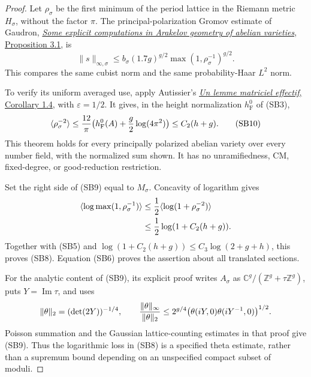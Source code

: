\begin{proof}
Let \(\rho_\sigma\) be the first minimum
of the period lattice in the Riemann metric
\(H_\sigma\), without the factor \(\pi\).
The principal-polarization Gromov estimate
of Gaudron,
\href{https://lmbp.uca.fr/~gaudron/art19.pdf}
{\emph{Some explicit computations in Arakelov
geometry of abelian varieties}, Proposition 3.1},
is
\[
 \|s\|_{\infty,\sigma}
     \le b_\sigma(1.7g)^{g/2}
                       \max(1,\rho_\sigma^{-1})^{g/2}. \tag{SB9}
\]
This compares the same cubist norm and
the same probability-Haar \(L^2\) norm.

To verify its uniform averaged use, apply
Autissier's
\href{https://www.math.u-bordeaux.fr/~pautissi/Matrix2.pdf}
{\emph{Un lemme matriciel effectif},
Corollary 1.4}, with \(\varepsilon=1/2\).
It gives, in the height normalization
\(h_{\mathrm F}^{0}\) of (SB3),
\[
 \langle\rho_\sigma^{-2}\rangle
       \le {12\over\pi}
                 \bigl(h_{\mathrm F}^{0}(A)
                                      +{g\over2}\log(4\pi^2)\bigr)
       \le C_2(h+g).                                \tag{SB10}
\]
This theorem holds for every principally
polarized abelian variety over every number
field, with the normalized sum shown.
It has no unramifiedness, CM, fixed-degree,
or good-reduction restriction.

Set the right side of (SB9) equal to
\(M_\sigma\).
Concavity of logarithm gives
\[
 \begin{split}
 \langle\log\max(1,\rho_\sigma^{-1})\rangle
   &\le {1\over2}
                  \langle\log(1+\rho_\sigma^{-2})\rangle\\
   &\le {1\over2}\log(1+C_2(h+g)).
 \end{split}
\]
Together with (SB5) and
\(\log(1+C_2(h+g))\le C_3\log(2+g+h)\),
this proves (SB8).
Equation (SB6) proves the assertion about
all translated sections.

For the analytic content of (SB9), its
explicit proof writes \(A_\sigma\) as
\(\mathbb C^g/(\mathbb Z^g+\tau\mathbb Z^g)\),
puts \(Y=\operatorname{Im}\tau\), and uses
\[
 \|\theta\|_2=(\det(2Y))^{-1/4},\qquad
 {\|\theta\|_\infty\over\|\theta\|_2}
       \le2^{g/4}
                  \bigl(\theta(iY,0)\theta(iY^{-1},0)\bigr)^{1/2}.
\]
Poisson summation and the Gaussian
lattice-counting estimates in that proof
give (SB9).
Thus the logarithmic loss in (SB8) is a
specified theta estimate, rather than a
supremum bound depending on an unspecified
compact subset of moduli.
\end{proof}

